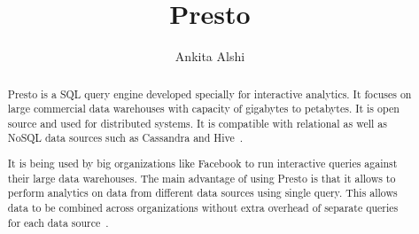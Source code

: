 \documentclass[sigconf]{acmart}
\begin{document}
\title{Presto}

\author{Ankita Alshi}





\begin{abstract}
Presto is a SQL query engine developed specially for interactive analytics. It
focuses on large commercial data warehouses with capacity of gigabytes to
petabytes. It is open source and used for distributed systems. It is compatible
with relational as well as NoSQL data sources such as Cassandra and 
Hive~\cite{hid-sp18-502-Presto}.

It is being used by big organizations like Facebook to run interactive queries
against their large data warehouses. The main advantage of using Presto is that
it allows to perform analytics on data from different data sources using single
query. This allows data to be combined across organizations without extra
overhead of separate queries for each data source~\cite{hid-sp18-502-Presto}.
\end{abstract}

%
%





\maketitle





\end{document}
